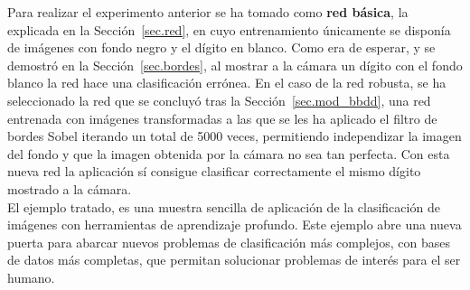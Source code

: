 Para realizar el experimento anterior se ha tomado como \textbf{red básica}, la explicada en la Sección~\ref{sec.red}, en cuyo entrenamiento únicamente se disponía de imágenes con fondo negro y el dígito en blanco. Como era de esperar, y se demostró en la Sección~\ref{sec.bordes}, al mostrar a la cámara un dígito con el fondo blanco la red hace una clasificación errónea. En el caso de la red robusta, se ha seleccionado la red que se concluyó tras la Sección~\ref{sec.mod_bbdd}, una red entrenada con imágenes transformadas a las que se les ha aplicado el filtro de bordes Sobel iterando un total de 5000 veces, permitiendo independizar la imagen del fondo y que la imagen obtenida por la cámara no sea tan perfecta. Con esta nueva red la aplicación sí consigue clasificar correctamente el mismo dígito mostrado a la cámara.\\

El ejemplo tratado, es una muestra sencilla de aplicación de la clasificación de imágenes con herramientas de aprendizaje profundo. Este ejemplo abre una nueva puerta para abarcar nuevos problemas de clasificación más complejos, con bases de datos más completas, que permitan solucionar problemas de interés para el ser humano.